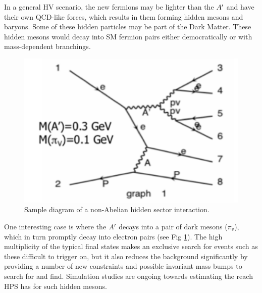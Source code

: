 In a general HV scenario, the new fermions may be lighter than the $A^\prime$ and have their own QCD-like forces, which results in them forming hidden mesons and baryons. Some of these hidden particles may be part of the Dark Matter. These hidden mesons would decay into SM fermion pairs  either democratically or with mass-dependent branchings. 
\begin{figure}[ht]
\includegraphics[scale=1]{measurements/multilepton-diagram.pdf}
\caption{Sample diagram of a non-Abelian hidden sector interaction.}
\label{fig:mldiagram}
\end{figure}
One interesting case is where the $A^\prime$ decays into a pair of dark mesons ($\pi_v$), which in turn promptly decay into electron pairs (see Fig \ref{fig:mldiagram}).  The high multiplicity of the typical final states makes an exclusive search for events such as these  difficult to trigger on, but it also reduces the background significantly by providing a number of new constraints and possible invariant mass bumps to search for and find.  Simulation studies are ongoing towards estimating the reach HPS has for such hidden mesons.  


%